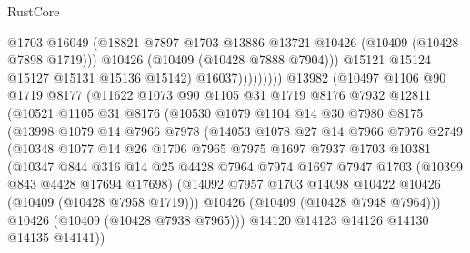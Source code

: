 \begin{lexlean}{RustCore}
\begin{coremodule}
                              @1703
                              @16049
                              (@18821
                                @7897
                                @1703
                                @13886
                                @13721
                                @10426
                                (@10409 (@10428 @7898 @1719)))
                              @10426
                              (@10409 (@10428 @7888 @7904)))
                            @15121
                            @15124
                            @15127
                            @15131
                            @15136
                            @15142)
                          @16037)))))))))
        @13982
        (@10497
          @1106
          @90
          @1719
          @8177
          (@11622
            @1073
            @90
            @1105
            @31
            @1719
            @8176
            @7932
            @12811
            (@10521
              @1105
              @31
              @8176
              (@10530
                @1079
                @1104
                @14
                @30
                @7980
                @8175
                (@13998
                  @1079
                  @14
                  @7966
                  @7978
                  (@14053
                    @1078
                    @27
                    @14
                    @7966
                    @7976
                    @2749
                    (@10348
                      @1077
                      @14
                      @26
                      @1706
                      @7965
                      @7975
                      @1697
                      @7937
                      @1703
                      @10381
                      (@10347
                        @844
                        @316
                        @14
                        @25
                        @4428
                        @7964
                        @7974
                        @1697
                        @7947
                        @1703
                        (@10399 @843 @4428 @17694 @17698)
                        (@14092 @7957 @1703 @14098 @10422 @10426 (@10409 (@10428 @7958 @1719)))
                        @10426
                        (@10409 (@10428 @7948 @7964)))
                      @10426
                      (@10409 (@10428 @7938 @7965)))
                    @14120
                    @14123
                    @14126
                    @14130
                    @14135
                    @14141))

\end{coremodule}
\end{lexlean}
